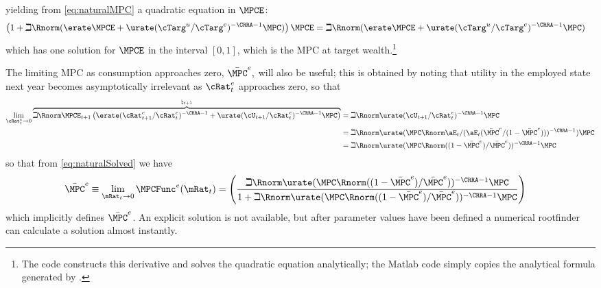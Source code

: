 \documentclass{handout}
\begin{document}
yielding from \eqref{eq:naturalMPC} a quadratic equation in $\MPCE$:
\begin{equation}\begin{gathered}\begin{aligned}
  \left(1+\beth \Rnorm (\erate \MPCE + \urate (\cTarg^{u}/\cTarg^{e})^{-\CRRA-1}  \MPCU) \right)\MPCE & =  \beth \Rnorm (\erate \MPCE + \urate (\cTarg^{u}/\cTarg^{e})^{-\CRRA-1} \MPCU) \label{eq:quadraticForTargetMPC}
\end{aligned}\end{gathered}\end{equation} 
which has one solution for $\MPCE$ in the interval $[0,1]$, which is the MPC at target wealth.\footnote{The 
\Mma code constructs this derivative and solves the quadratic equation analytically; the Matlab code simply copies
the analytical formula generated by \Mma.}

The limiting MPC as consumption approaches zero, $\bar{\MPC}^{e},$ will also be useful; this is obtained
by noting that utility in the employed state next year becomes asymptotically irrelevant as ${\cRat}^{e}_{t}$ approaches zero, so that 
\begin{equation*}\begin{gathered}\begin{aligned}
  \lim_{{\cRat}^{e}_{t} \rightarrow 0}  \overbrace{ \beth \Rnorm \MPCE_{t+1} \left(\erate ({\cRat}^{e}_{t+1}/{\cRat}^{e}_{t})^{-\CRRA-1}  + \urate (\cU_{t+1}/{\cRat}^{e}_{t})^{-\CRRA-1}\MPCU\right)}^{\natural_{t+1}} & =  \beth \Rnorm \urate (\cU_{t+1}/{\cRat}^{e}_{t})^{-\CRRA-1}\MPCU
\\  & =  \beth \Rnorm \urate (\MPCU \Rnorm \aE_{t}/(\aE_{t}(\bar{\MPC}^{e}/(1-\bar{\MPC}^{e})))^{-\CRRA-1})\MPCU
\\ & =  \beth \Rnorm \urate (\MPCU \Rnorm ((1-\bar{\MPC}^{e})/\bar{\MPC}^{e}))^{-\CRRA-1}\MPCU
\end{aligned}\end{gathered}\end{equation*}
so that from \eqref{eq:naturalSolved} we have 
\begin{equation}\begin{gathered}\begin{aligned}
  \bar{\MPC}^{e} \equiv \lim_{\mRat_{t} \rightarrow 0} \MPCFunc^{e}(\mRat_{t}) & =  \left(\frac{
\beth \Rnorm \urate (\MPCU \Rnorm ((1-\bar{\MPC}^{e})/\bar{\MPC}^{e}))^{-\CRRA-1}\MPCU
}{1+
\beth \Rnorm \urate (\MPCU \Rnorm ((1-\bar{\MPC}^{e})/\bar{\MPC}^{e}))^{-\CRRA-1}\MPCU
}\right) \label{eq:MPCat0}
\end{aligned}\end{gathered}\end{equation}
which implicitly defines $\bar{\MPC}^{e}$.  An explicit solution is not available, but after 
parameter values have been defined a numerical rootfinder can calculate a solution almost instantly. 
\end{document}
